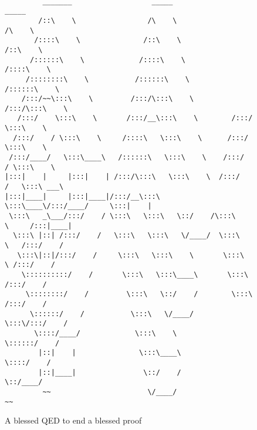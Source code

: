 \begin{Questions}
{ \\}
 \begin{figure}
\begin{verbatim}
         _______                   _____                    _____          
        /::\    \                 /\    \                  /\    \         
       /::::\    \               /::\    \                /::\    \        
      /::::::\    \             /::::\    \              /::::\    \       
     /::::::::\    \           /::::::\    \            /::::::\    \      
    /:::/~~\:::\    \         /:::/\:::\    \          /:::/\:::\    \     
   /:::/    \:::\    \       /:::/__\:::\    \        /:::/  \:::\    \    
  /:::/    / \:::\    \     /::::\   \:::\    \      /:::/    \:::\    \   
 /:::/____/   \:::\____\   /::::::\   \:::\    \    /:::/    / \:::\    \  
|:::|    |     |:::|    | /:::/\:::\   \:::\    \  /:::/    /   \:::\ ___\ 
|:::|____|     |:::|____|/:::/__\:::\   \:::\____\/:::/____/     \:::|    |
 \:::\   _\___/:::/    / \:::\   \:::\   \::/    /\:::\    \     /:::|____|
  \:::\ |::| /:::/    /   \:::\   \:::\   \/____/  \:::\    \   /:::/    / 
   \:::\|::|/:::/    /     \:::\   \:::\    \       \:::\    \ /:::/    /  
    \::::::::::/    /       \:::\   \:::\____\       \:::\    /:::/    /   
     \::::::::/    /         \:::\   \::/    /        \:::\  /:::/    /    
      \::::::/    /           \:::\   \/____/          \:::\/:::/    /     
       \::::/____/             \:::\    \               \::::::/    /      
        |::|    |               \:::\____\               \::::/    /       
        |::|____|                \::/    /                \::/____/        
         ~~                       \/____/                  ~~                  
\end{verbatim}
\caption{A blessed QED to end a blessed proof}
\end{figure}

 \vfill\eject
 \clearpage
 \end{Questions}
 